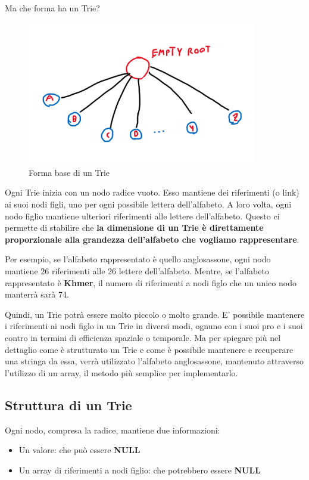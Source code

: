 \documentclass[a4paper, 12pt]{article}
\begin{document}
Ma che forma ha un Trie?

\clearpage
\begin{figure}[ht!]
    \centering
    \includegraphics[width=10cm]{Images/shape trie.png}
    \caption{Forma base di un Trie}
    \label{fig:shapetrie}
\end{figure}

Ogni Trie inizia con un nodo radice vuoto. Esso mantiene dei riferimenti (o link) ai suoi nodi figli, uno per ogni possibile lettera dell'alfabeto. A loro volta, ogni nodo figlio mantiene ulteriori riferimenti alle lettere dell'alfabeto. Questo ci permette di stabilire che \textbf{la dimensione di un Trie è direttamente proporzionale alla grandezza dell'alfabeto che vogliamo rappresentare}.

Per esempio, se l'alfabeto rappresentato è quello anglosassone, ogni nodo mantiene 26 riferimenti alle 26 lettere dell'alfabeto. Mentre, se l'alfabeto rappresentato è \textbf{Khmer}, il numero di riferimenti a nodi figlo che un unico nodo manterrà sarà 74.

Quindi, un Trie potrà essere molto piccolo o molto grande. E' possibile mantenere i riferimenti ai nodi figlo in un Trie in diversi modi, ognuno con i suoi pro e i suoi contro in termini di efficienza spaziale o temporale. Ma per spiegare più nel dettaglio come è strutturato un Trie e come è possibile mantenere e recuperare una stringa da essa, verrà utilizzato l'alfabeto anglosassone, mantenuto attraverso l'utilizzo di un array, il metodo più semplice per implementarlo.

\clearpage
\subsection{Struttura di un Trie}
Ogni nodo, compresa la radice, mantiene due informazioni:
\begin{itemize}
    \item Un valore: che può essere \textbf{NULL}
    \item Un array di riferimenti a nodi figlio: che potrebbero essere \textbf{NULL}
\end{itemize}
\end{document}

